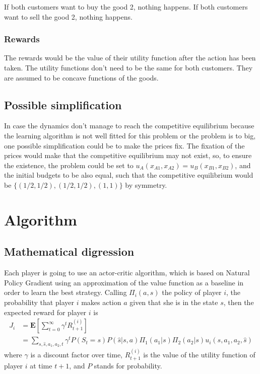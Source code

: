 \documentclass{article}
\begin{document}
If both customers want to buy the good 2, nothing happens. If both customers want to sell the good 2, nothing happens.  

\subsubsection*{Rewards}
The rewards would be the value of their utility function after the action has been taken. The utility functions don't need to be the same for both customers. They are assumed to be concave functions of the goods. 

\subsection*{Possible simplification }
In case the dynamics don't manage to reach the competitive equilibrium because the learning algorithm is not well fitted for this problem or the problem is to big, one possible simplification could be to make the prices fix. The fixation of the prices would make that the competitive equilibrium may not exist, so, to ensure the existence, the problem could be set to $u_A(x_{A1},x_{A2})=u_B(x_{B1},x_{B2})$, and the initial budgets to be also equal, such that the competitive equilibrium would be $\{ (1/2,1/2),(1/2,1/2),(1,1)   \}$ by symmetry. 

\section{Algorithm}
\subsection*{Mathematical digression}
Each player is going to use an actor-critic algorithm, which is based on Natural Policy Gradient using an approximation of the value function as a baseline in order to learn the best strategy. Calling $\Pi_i(a,s)$ the policy of player $i$, the probability that player $i$ makes action $a$ given that she is in the state $s$, then the expected reward for player $i$ is
\begin{equation}
\begin{aligned}
    J_i &= \mathbf{E}[\sum_{t=0}^{\infty} \gamma^t R_{t+1}^{(i)}]\\&=\sum_{s,\hat{s},a_1,a_2,t}\gamma^tP(S_t = s)P(\hat{s}|s,a)\Pi_1(a_1|s)\Pi_2(a_2|s)u_i(s,a_1,a_2,\hat{s})
\end{aligned}
\end{equation}
where $\gamma$ is a discount factor over time, $R_{t+1}^{(i)}$ is the value of the utility function of player $i$ at time $t+1$, and $P$ stands for probability. 
\end{document}
